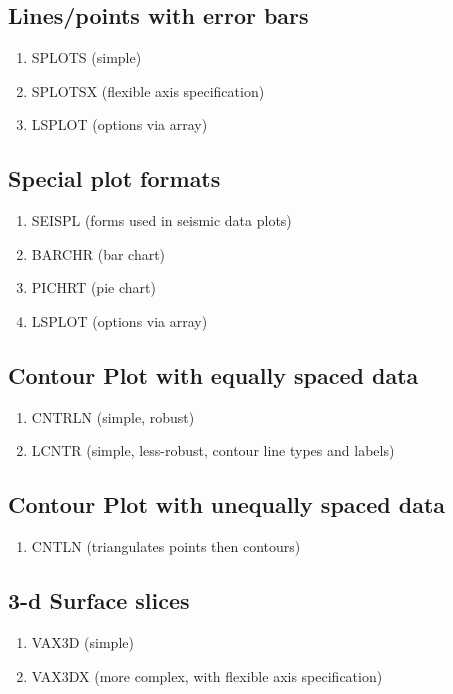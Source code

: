 \documentclass[11pt]{report}
\begin{document}
\subsection{Lines/points with error bars}
\begin{enumerate}
\item  SPLOTS (simple)
\item  SPLOTSX (flexible axis specification)
\item  LSPLOT (options via array)
\end{enumerate}

\subsection{Special plot formats}
\begin{enumerate}
\item  SEISPL (forms used in seismic data plots)
\item  BARCHR (bar chart)
\item  PICHRT (pie chart)
\item  LSPLOT (options via array)
\end{enumerate}

\subsection{Contour Plot with equally spaced data}
\begin{enumerate}
\item  CNTRLN (simple, robust)
\item  LCNTR  (simple, less-robust, contour line types and labels)
\end{enumerate}

\subsection{Contour Plot with unequally spaced data}
\begin{enumerate}
\item CNTLN  (triangulates points then contours)
\end{enumerate}

\subsection{3-d Surface slices}
\begin{enumerate}
\item  VAX3D  (simple)
\item  VAX3DX (more complex, with flexible axis specification)
\end{enumerate}
\end{document}
